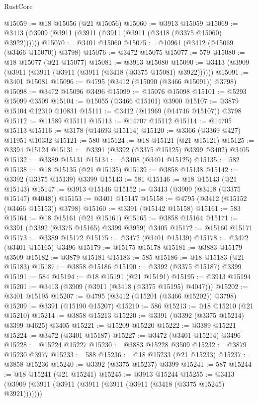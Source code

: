 \begin{lexlean}{RustCore}
\begin{coremodule}
@15059 := @18 @15056 (@21 @15056)
@15060 := @3913 @15059
@15069 := @3413 (@3909 (@3911 (@3911 (@3911 (@3911 (@3418 (@3375 @15060) @3922))))))
@15070 := @3401 @15060
@15075 := @10961 (@3412 (@15069 (@3466 @15070)) @3798)
@15076 := @3472 @15075
@15077 := 579
@15080 := @18 @15077 (@21 @15077)
@15081 := @3913 @15080
@15090 := @3413 (@3909 (@3911 (@3911 (@3911 (@3911 (@3418 (@3375 @15081) @3922))))))
@15091 := @3401 @15081
@15096 := @4795 (@3412 (@15090 (@3466 @15091)) @3798)
@15098 := @3472 @15096 @3496
@15099 := @15076 @15098
@15101 := @5293 @15099 @3509
@15104 := @15055 (@3466 @15101) @3900
@15107 := @3879 @15104 @12310 @10831
@15111 := @3412 (@11969 (@14746 @15107)) @3798
@15112 := @11589 @15111
@15113 := @14707 @15112
@15114 := @14705 @15113
@15116 := @3178 (@14693 @15114)
@15120 := @3366 (@3369 @427) @11951 @10332
@15121 := 580
@15124 := @18 @15121 (@21 @15121)
@15125 := @3394 @15124
@15131 := @3391 (@3392 (@3375 @15125) @3399 @3402) @3405
@15132 := @3389 @15131
@15134 := @3408 (@3401 @15125)
@15135 := 582
@15138 := @18 @15135 (@21 @15135)
@15139 := @3858 @15138
@15142 := @3392 (@3375 @15139) @3399
@15143 := 581
@15146 := @18 @15143 (@21 @15143)
@15147 := @3913 @15146
@15152 := @3413 (@3909 (@3418 (@3375 @15147) @4048))
@15153 := @3401 @15147
@15158 := @4795 (@3412 (@15152 (@3466 @15153)) @3798)
@15160 := @3391 (@15142 @15158)
@15161 := 583
@15164 := @18 @15161 (@21 @15161)
@15165 := @3858 @15164
@15171 := @3391 (@3392 (@3375 @15165) @3399 @3959) @3405
@15172 := @15160 @15171
@15173 := @3389 @15172
@15175 := @3472 (@3401 @15139)
@15178 := @3472 (@3401 @15165) @3496
@15179 := @15175 @15178
@15181 := @3883 @15179 @3509
@15182 := @3879 @15181
@15183 := 585
@15186 := @18 @15183 (@21 @15183)
@15187 := @3858 @15186
@15190 := @3392 (@3375 @15187) @3399
@15191 := 584
@15194 := @18 @15191 (@21 @15191)
@15195 := @3913 @15194
@15201 := @3413 (@3909 (@3911 (@3418 (@3375 @15195) @4047)))
@15202 := @3401 @15195
@15207 := @4795 (@3412 (@15201 (@3466 @15202)) @3798)
@15209 := @3391 (@15190 @15207)
@15210 := 586
@15213 := @18 @15210 (@21 @15210)
@15214 := @3858 @15213
@15220 := @3391 (@3392 (@3375 @15214) @3399 @4625) @3405
@15221 := @15209 @15220
@15222 := @3389 @15221
@15224 := @3472 (@3401 @15187)
@15227 := @3472 (@3401 @15214) @3496
@15228 := @15224 @15227
@15230 := @3883 @15228 @3509
@15232 := @3879 @15230 @3977
@15233 := 588
@15236 := @18 @15233 (@21 @15233)
@15237 := @3858 @15236
@15240 := @3392 (@3375 @15237) @3399
@15241 := 587
@15244 := @18 @15241 (@21 @15241)
@15245 := @3913 @15244
@15255 := @3413 (@3909 (@3911 (@3911 (@3911 (@3911 (@3911 (@3418 (@3375 @15245) @3921)))))))

\end{coremodule}
\end{lexlean}

